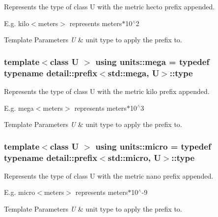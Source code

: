 Represents the type of {\ttfamily class U} with the metric \textquotesingle{}hecto\textquotesingle{} prefix appended. 

E.\+g. kilo$<$meters$>$ represents meters$\ast$10$^\wedge$2 
\begin{DoxyTemplParams}{Template Parameters}
{\em U} & unit type to apply the prefix to. \\
\hline
\end{DoxyTemplParams}
\hypertarget{group___unit_manipulators_gab1e685fcf4dd9478ed3d688f7af50842}{}
\subsubsection[{mega}]{\setlength{\rightskip}{0pt plus 5cm}template$<$class U $>$ using {\bf units\+::mega} = typedef typename detail\+::prefix$<$std\+::mega, U$>$\+::type}\label{group___unit_manipulators_gab1e685fcf4dd9478ed3d688f7af50842}


Represents the type of {\ttfamily class U} with the metric \textquotesingle{}kilo\textquotesingle{} prefix appended. 

E.\+g. mega$<$meters$>$ represents meters$\ast$10$^\wedge$3 
\begin{DoxyTemplParams}{Template Parameters}
{\em U} & unit type to apply the prefix to. \\
\hline
\end{DoxyTemplParams}
\hypertarget{group___unit_manipulators_gaea53c906ec805110b93f02db4a961971}{}
\subsubsection[{micro}]{\setlength{\rightskip}{0pt plus 5cm}template$<$class U $>$ using {\bf units\+::micro} = typedef typename detail\+::prefix$<$std\+::micro, U$>$\+::type}\label{group___unit_manipulators_gaea53c906ec805110b93f02db4a961971}


Represents the type of {\ttfamily class U} with the metric \textquotesingle{}nano\textquotesingle{} prefix appended. 

E.\+g. micro$<$meters$>$ represents meters$\ast$10$^\wedge$-\/9 
\begin{DoxyTemplParams}{Template Parameters}
{\em U} & unit type to apply the prefix to. \\
\hline
\end{DoxyTemplParams}
\hypertarget{group___unit_manipulators_gaec9d1c320e180eb59f3cb3094d8079dd}{}
